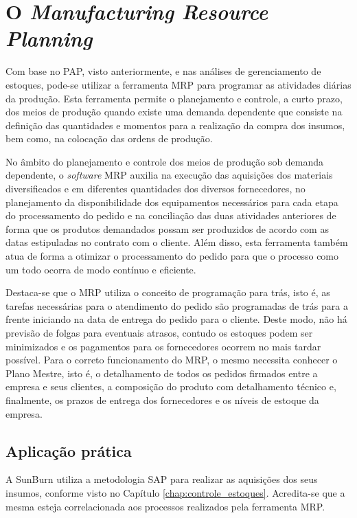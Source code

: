 \chapter{O \textit{Manufacturing Resource Planning}}
\label{chap:manufacturing_resource_planning}

Com base no \ac{PAP}, visto anteriormente, e nas análises de gerenciamento de estoques, pode-se utilizar a ferramenta \ac{MRP} para programar as atividades diárias da produção. Esta ferramenta permite o planejamento e controle, a curto prazo, dos meios de produção quando existe uma demanda dependente que consiste na definição das quantidades e momentos para a realização da compra dos insumos, bem como, na colocação das ordens de produção.

No âmbito do planejamento e controle dos meios de produção sob demanda dependente, o \textit{software} \ac{MRP} auxilia na execução das aquisições dos materiais diversificados e em diferentes quantidades dos diversos fornecedores, no planejamento da disponibilidade dos equipamentos necessários para cada etapa do processamento do pedido e na conciliação das duas atividades anteriores de forma que os produtos demandados possam ser produzidos de acordo com as datas estipuladas no contrato com o cliente. Além disso, esta ferramenta também atua de forma a otimizar o processamento do pedido para que o processo como um todo ocorra de modo contínuo e eficiente.

Destaca-se que o \ac{MRP} utiliza o conceito de programação para trás, isto é, as tarefas necessárias para o atendimento do pedido são programadas de trás para a frente iniciando na data de entrega do pedido para o cliente. Deste modo, não há previsão de folgas para eventuais atrasos, contudo os estoques podem ser minimizados e os pagamentos para os fornecedores ocorrem no mais tardar possível. Para o correto funcionamento do \ac{MRP}, o mesmo necessita conhecer o Plano Mestre, isto é, o detalhamento de todos os pedidos firmados entre a empresa e seus clientes, a composição do produto com detalhamento técnico e, finalmente, os prazos de entrega dos fornecedores e os níveis de estoque da empresa.


\section{Aplicação prática}
\label{sec:manufacturing_resource_planning_aplicacao}
A SunBurn utiliza a metodologia \ac{SAP} para realizar as aquisições dos seus insumos, conforme visto no Capítulo \ref{chap:controle_estoques}. Acredita-se que a mesma esteja correlacionada aos processos realizados pela ferramenta \ac{MRP}.
